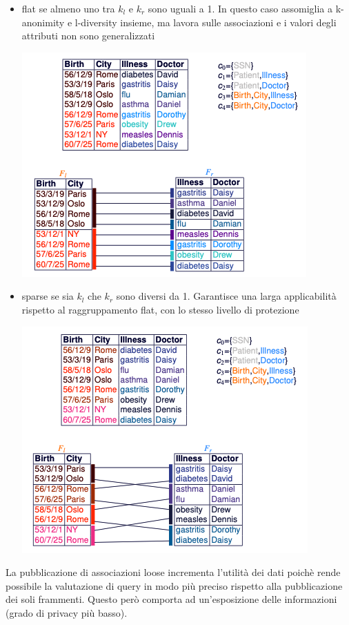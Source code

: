 \begin{itemize}
    \item flat se almeno uno tra \(k_l\) e \(k_r\) sono uguali a 1. In questo caso assomiglia a k-anonimity e l-diversity insieme, ma lavora sulle associazioni e i valori degli attributi non sono generalizzati
    \begin{center}
        \includegraphics[scale=0.5]{img/flat.png}
    \end{center}
    \item sparse se sia \(k_l\) che \(k_r\) sono diversi da 1. Garantisce una larga applicabilità rispetto al raggruppamento flat, con lo stesso livello di protezione
    \begin{center}
        \includegraphics[scale=0.5]{img/sparse.png}
    \end{center}
\end{itemize}
La pubblicazione di associazioni loose incrementa l'utilità dei dati poichè rende possibile la valutazione di query in modo più preciso rispetto alla  pubblicazione dei soli frammenti. Questo però comporta ad un'esposizione delle informazioni (grado di privacy più basso).\\
